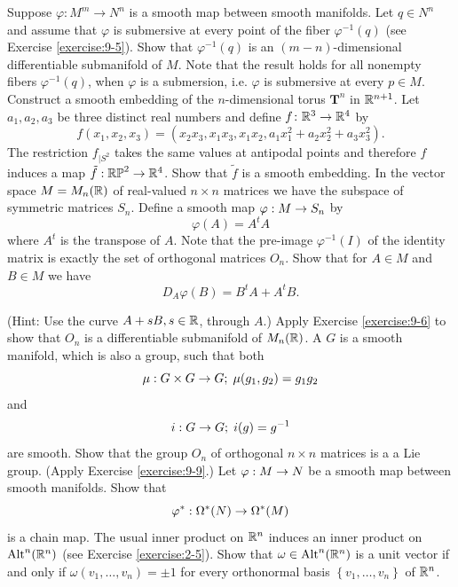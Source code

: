 \begin{enumerate}[label=\theexercise.\arabic*.,ref=\theexercise.\arabic*,leftmargin=2.7em]
  \NewItem Suppose $\varphi:M^m\to N^n$ is a smooth map between smooth manifolds. Let
    $q\in N^n$ and assume that $\varphi$ is submersive at every point of the fiber
    $\varphi^{-1}(q)$ (see Exercise \ref{exercise:9-5}). Show that $\varphi^{-1}(q)$ is an $(m- n)$-dimensional
    differentiable submanifold of $M$. Note that the result holds for all nonempty fibers $\varphi^{-1}(q)$, when $\varphi$
    is a submersion, i.e. $\varphi$ is submersive at every $p\in M$.
  \NewItem Construct a smooth embedding of the $n$-dimensional torus ${\mathbf{T}}^{n}$ in ${\mathbb{R}}^{n + 1}$.
  \NewItem Let ${a}_{1},{a}_{2},{a}_{3}$ be three distinct real numbers and define $f\colon {\ensuremath{\mathbb{R}}}^{3} \rightarrow  {\ensuremath{\mathbb{R}}}^{4}$ by
    \[
      f( {{x}_{1},{x}_{2},{x}_{3}})  = ( {{x}_{2}{x}_{3},{x}_{1}{x}_{3},{x}_{1}{x}_{2},{a}_{1}{x}_{1}^{2} + {a}_{2}{x}_{2}^{2} + {a}_{3}{x}_{3}^{2}}).
    \]
    The restriction ${f}_{\mid {S}^{2}}$ takes the same values at antipodal points and therefore $f$ induces a map $\tilde{f} : {\mathbb{{RP}}}^{2} \rightarrow  {\ensuremath{\mathbb{R}}}^{4}$. Show that $\tilde{f}$ is a smooth embedding.
  \NewItem In the vector space $M = {M}_{n}( \mathbb{R})$ of real-valued $n \times  n$ matrices we have the subspace of symmetric matrices ${S}_{n}$. Define a smooth map $\varphi  : M \rightarrow  {S}_{n}$ by
    \[
      \varphi ( A)  = {A}^{t}A
    \]
    where ${A}^{t}$ is the transpose of $A$. Note that the pre-image ${\varphi }^{-1}( I)$ of the identity matrix is exactly the set of orthogonal matrices ${O}_{n}$. Show that for $A \in  M$ and $B \in  M$ we have
    \[
      {D}_{A}\varphi ( B)  = {B}^{t}A + {A}^{t}B.
    \]
    \par(Hint: Use the curve $A + {sB},s \in  \mathbb{R}$, through $A$.)
    Apply Exercise \ref{exercise:9-6} to show that ${O}_{n}$ is a differentiable submanifold of ${M}_{n}( \mathbb{R})$.
  \NewItem A  $G$ is a smooth manifold, which is also a group, such that both
    \[
      \mu  : G \times  G \rightarrow  G;\;\mu ( {{g}_{1},{g}_{2}})  = {g}_{1}{g}_{2}
    \]
    and
    \[
      i : G \rightarrow  G;\;i( g)  = {g}^{-1}
    \]
    are smooth. Show that the group ${O}_{n}$ of orthogonal $n \times  n$ matrices is a a Lie group. (Apply Exercise \ref{exercise:9-9}.)
  \NewItem Let $\varphi  : M \rightarrow  N$ be a smooth map between smooth manifolds. Show that
    \[
      {\varphi }^* : {\Omega }^*( N)  \rightarrow  {\Omega }^*( M)
    \]
    is a chain map.
  \NewItem The usual inner product on ${\mathbb{R}}^{n}$ induces an inner product on ${\operatorname{Alt}}^{n}( {\mathbb{R}}^{n})$ (see Exercise \ref{exercise:2-5}). Show that $\omega  \in  {\operatorname{Alt}}^{n}( {\mathbb{R}}^{n})$ is a unit vector if and only if $\omega ( {{v}_{1},\ldots,{v}_{n}})  =  \pm  1$ for every orthonormal basis $\left\{  {{v}_{1},\ldots,{v}_{n}}\right\}$ of ${{\mathbb{R}}}^{n}$.

\end{enumerate}
